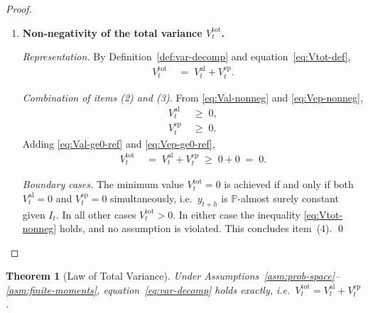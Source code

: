 \documentclass[12pt,openany]{book}
\newcommand{\calI}{\mathcal{I}}
\numberwithin{equation}{chapter}
\theoremstyle{plain}
\newtheorem{theorem}{Theorem}[chapter]
\theoremstyle{definition}
\theoremstyle{remark}
\numberwithin{equation}{chapter}
\theoremstyle{plain}
\def\calI{I}%
\begin{document}
\begin{proof}
\begin{enumerate}
        \noindent\textit{Edge case.}
        If $g(\theta) = \bar{g}$ for $\pi$-almost every $\theta$
        (i.e.\ the posterior predictive mean is constant across
        parameter draws, reflecting no epistemic uncertainty),
        then $V^{\mathrm{ep}}_t = 0$; the inequality holds with
        equality and is not violated.  This concludes item~(3).

  \item \textbf{Non-negativity of the total variance
        $V^{\mathrm{tot}}_t$.}

        \noindent\textit{Representation.}
        By Definition~\ref{def:var-decomp} and
        equation~\eqref{eq:Vtot-def},
        \begin{align}
          V^{\mathrm{tot}}_t
          &\;=\;
            V^{\mathrm{al}}_t + V^{\mathrm{ep}}_t.
          \label{eq:Vtot-sum}
        \end{align}

        \noindent\textit{Combination of items (2) and (3).}
        From \eqref{eq:Val-nonneg} and \eqref{eq:Vep-nonneg},
        \begin{align}
          V^{\mathrm{al}}_t &\;\geq\; 0,
          \label{eq:Val-ge0-ref}\\
          V^{\mathrm{ep}}_t &\;\geq\; 0.
          \label{eq:Vep-ge0-ref}
        \end{align}
        Adding \eqref{eq:Val-ge0-ref} and \eqref{eq:Vep-ge0-ref},
        \begin{align}
          V^{\mathrm{tot}}_t
          &\;=\;
            V^{\mathrm{al}}_t + V^{\mathrm{ep}}_t
          \;\geq\; 0 + 0
          \;=\; 0.
          \label{eq:Vtot-nonneg}
        \end{align}

        \noindent\textit{Boundary cases.}
        The minimum value $V^{\mathrm{tot}}_t = 0$ is achieved
        if and only if both $V^{\mathrm{al}}_t = 0$ and
        $V^{\mathrm{ep}}_t = 0$ simultaneously, i.e.\ $y_{t+h}$
        is $\mathbb{P}$-almost surely constant given $\calI_t$.
        In all other cases $V^{\mathrm{tot}}_t > 0$.  In either
        case the inequality \eqref{eq:Vtot-nonneg} holds, and
        no assumption is violated.  This concludes item~(4). \qed

\end{enumerate}
\end{proof}

\begin{theorem}[Law of Total Variance]
\label{thm:ltv}
Under Assumptions~\ref{asm:prob-space}--\ref{asm:finite-moments},
equation~\eqref{eq:var-decomp} holds exactly, i.e.\
$V^{\mathrm{tot}}_t = V^{\mathrm{al}}_t + V^{\mathrm{ep}}_t$.
\end{theorem}
\end{document}
